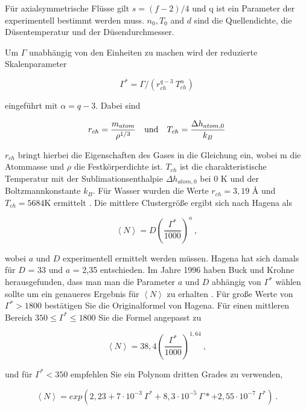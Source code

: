 Für axialsymmetrische Flüsse gilt $s = (f-2)/4$ und q ist ein Parameter der experimentell bestimmt werden muss. $n_0, T_0$ and $d$ sind die Quellendichte, die Düsentemperatur und der Düsendurchmesser.

Um $\Gamma$ unabhängig von den Einheiten zu machen wird der reduzierte Skalenparameter

\begin{equation} \label{eq:RedSkalenparameter}
\Gamma^* = \Gamma / (r_{ch}^{q-3}\ T_{ch}^{\alpha})
\end{equation}

eingeführt mit $\alpha= q - 3$. Dabei sind

\begin{equation}
r_{ch} = \frac{m_{atom}}{\rho ^{1/3}}\quad \textmd{und}\quad T_{ch}= \frac{ \Delta h_{atom,0}}{k_B}
\end{equation}

$r_{ch}$ bringt hierbei die Eigenschaften des Gases in die Gleichung ein, wobei m die Atommasse und $\rho$ die Festkörperdichte ist. $T_{ch}$ ist die charakteristische Temperatur mit der Sublimationsenthalpie $\Delta h_{atom,0}$ bei 0 K  und der Boltzmannkonstante $k_B$. Für Wasser wurden die Werte $r_{ch} = 3,19$ \AA{} und $T_{ch} = 5684$K ermittelt \cite{bobbert2002}. Die mittlere Clustergröße ergibt sich nach Hagena als

\begin{equation} \label{eq:HagOriginalFormel}
\left\langle N \right\rangle  = D \left( \frac{\Gamma^*}{1000}\right)^a \:,
\end{equation}

wobei $a$ und $D$ experimentell ermittelt werden müssen. Hagena hat sich damals für $D$ = 33 und $a$ = 2,35 entschieden. Im Jahre 1996 haben Buck und Krohne herausgefunden, dass man man die Parameter $a$ und $D$ abhängig von $\Gamma^*$ wählen sollte um ein genaueres Ergebnis für $\left\langle N \right\rangle $ zu erhalten \cite{buck1996}. Für große Werte von $\Gamma^* > 1800$ bestätigen Sie die Originalformel von Hagena. 
Für einen mittleren Bereich $350 \leq \Gamma^* \leq 1800$ Sie die Formel angepasst zu

\begin{equation}
\left\langle N \right\rangle  = 38,4 \left( \frac{\Gamma^*}{1000}\right)^{1,64} \:,
\end{equation}

und für $\Gamma^* < 350$ empfehlen Sie ein Polynom dritten Grades zu verwenden,

\begin{equation}
\left\langle N \right\rangle  = exp(2,23 + 7 \cdot 10^{-3}\ \Gamma^* + 8,3 \cdot 10^{-5}\ \Gamma* + 2,55 \cdot 10^{-7}\ \Gamma^* ) \:.
\end{equation}

